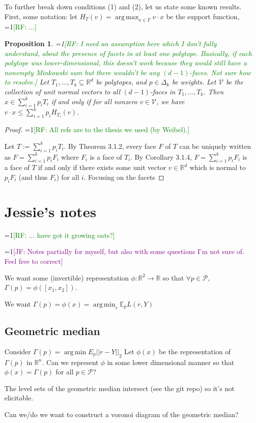 \documentclass[11pt]{article}
\newcommand{\Comments}{1}
\newcommand{\mynote}[2]{\ifnum\Comments=1\textcolor{#1}{#2}\fi}
\newcommand{\raf}[1]{\mynote{green}{[RF: #1]}}
\newcommand{\jessie}[1]{\mynote{purple}{[JF: #1]}}
\newcommand{\reals}{\mathbb{R}}
\newcommand{\E}{\mathbb{E}}
\renewcommand{\P}{\mathcal{P}}
\DeclareMathOperator*{\argmax}{arg\,max}
\DeclareMathOperator*{\argmin}{arg\,min}
\newtheorem{proposition}{Proposition}
\begin{document}
To further break down conditions (1) and (2), let us state some known results.
First, some notation: let $H_T(v) = \argmax_{x\in T} v\cdot x$ be the support function, \raf{...}
\begin{proposition}
  \raf{I need an assumption here which I don't fully understand, about the presence of facets in at least one polytope.  Basically, if each polytope was lower-dimensional, this doesn't work because they would still have a nonempty Minkowski sum but there wouldn't be any $(d-1)$-faces.  Not sure how to resolve.}
  Let $T_1,\ldots,T_k\subseteq\reals^d$ be polytopes, and $p\in\Delta_k$ be weights.
  Let  $\mathcal{V}$ be the collection of unit normal vectors to all $(d-1)$-faces in $T_1,\ldots,T_k$.
  Then $x \in \sum_{i=1}^k p_i T_i$ if and only if for all nonzero $v\in\mathcal{V}$, we have $v\cdot x \leq \sum_{i=1}^k p_i H_{T_i}(v)$. 
\end{proposition}
\begin{proof}
  \raf{All refs are to the thesis we used (by Weibel).}

  Let $T := \sum_{i=1}^k p_i T_i$.
  By Theorem 3.1.2, every face $F$ of $T$ can be uniquely written as $F = \sum_{i=1}^k p_i F_i$ where $F_i$ is a face of $T_i$.
  By Corollary 3.1.4, $F = \sum_{i=1}^k p_i F_i$ is a face of $T$ if and only if there exists some unit vector $v\in\reals^d$ which is normal to $p_iF_i$ (and thus $F_i$) for all $i$.
  Focusing on the facets
  
\end{proof}



\newpage\newpage

\section{Jessie's notes}
\raf{... have got it growing oats?}

\jessie{Notes partially for myself, but also with some questions I'm not sure of.  Feel free to correct}

We want some (invertible) representation $\phi: \reals^2 \to \reals$ so that $\forall p \in \P$, $\Gamma(p) = \phi([ x_1, x_2 ])$.

We want $\Gamma(p) = \phi(x) = \argmin_r \E_p L(r, Y)$

\subsection{Geometric median}
Consider $\Gamma(p) = \argmin E_p ||r - Y ||_2$
Let $\phi(x)$ be the representation of $\Gamma(p)$ in $\reals^n$.
Can we represent $\phi$ in some lower dimensional manner so that $\phi(x) = \Gamma(p)$ for all $p \in \P$?

The level sets of the geometric median intersect (see the git repo) so it's not elicitable.

Can we/do we want to construct a voronoi diagram of the geometric median?
\end{document}
